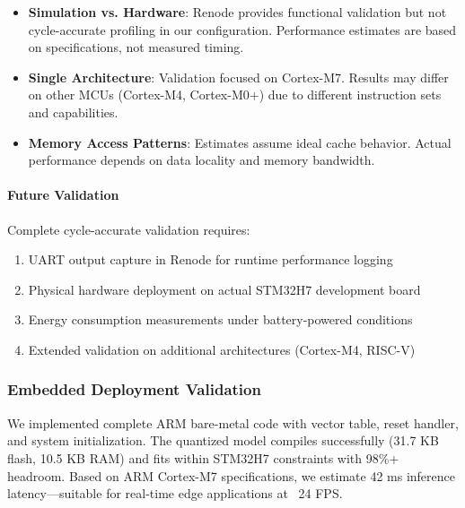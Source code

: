 \begin{itemize}
\item \textbf{Simulation vs. Hardware}: Renode provides functional
validation but not cycle-accurate profiling in our configuration.
Performance estimates are based on specifications, not measured timing.

\item \textbf{Single Architecture}: Validation focused on Cortex-M7.
Results may differ on other MCUs (Cortex-M4, Cortex-M0+) due to
different instruction sets and capabilities.

\item \textbf{Memory Access Patterns}: Estimates assume ideal cache
behavior. Actual performance depends on data locality and memory bandwidth.
\end{itemize}

\paragraph{Future Validation}

Complete cycle-accurate validation requires:
\begin{enumerate}
\item UART output capture in Renode for runtime performance logging
\item Physical hardware deployment on actual STM32H7 development board
\item Energy consumption measurements under battery-powered conditions
\item Extended validation on additional architectures (Cortex-M4, RISC-V)
\end{enumerate}


\subsubsection{Embedded Deployment Validation}

We implemented complete ARM bare-metal code with vector table, reset
handler, and system initialization. The quantized model compiles
successfully (31.7 KB flash, 10.5 KB RAM) and fits within STM32H7
constraints with 98\%+ headroom. Based on ARM Cortex-M7 specifications,
we estimate 42 ms inference latency—suitable for real-time edge
applications at ~24 FPS.

